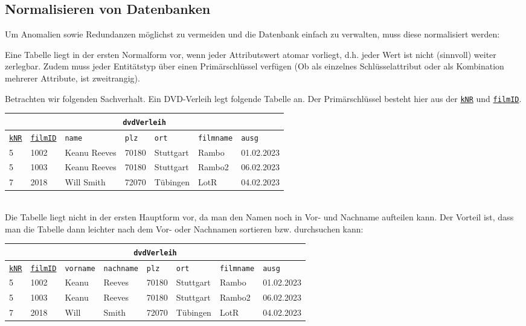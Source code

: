 \subsection[Normalisieren]{Normalisieren von Datenbanken}
Um Anomalien sowie Redundanzen möglichst zu vermeiden und die Datenbank einfach zu verwalten, muss diese normalisiert werden:
\begin{tcolorbox}[title=Erste Normalform]
	Eine Tabelle liegt in der ersten Normalform vor, wenn jeder Attributswert atomar vorliegt, d.h. jeder Wert ist nicht (sinnvoll) weiter zerlegbar. Zudem muss jeder Entitätstyp über einen Primärschlüssel verfügen (Ob als einzelnes Schlüsselattribut oder als Kombination mehrerer Attribute, ist zweitrangig).
\end{tcolorbox}
Betrachten wir folgenden Sachverhalt. Ein DVD-Verleih legt folgende Tabelle an. Der Primärschlüssel besteht hier aus der \underline{\lstinline!kNR!} und \underline{\lstinline!filmID!}.
\begin{tabular}{lllllll}
	\multicolumn{7}{c}{\lstinline!dvdVerleih!}\\
	\hline
	\underline{\lstinline!kNR!}&\underline{\lstinline!filmID!}&\lstinline!name!&\lstinline!plz!&\lstinline!ort!&\lstinline!filmname!&\lstinline!ausg!\\
	\hline
	5&1002&Keanu Reeves&70180&Stuttgart&Rambo&01.02.2023\\
	5&1003&Keanu Reeves&70180&Stuttgart&Rambo2&06.02.2023\\
	7&2018&Will Smith&72070&Tübingen&LotR&04.02.2023\\
\end{tabular}\\
Die Tabelle liegt nicht in der ersten Hauptform vor, da man den Namen noch in Vor- und Nachname aufteilen kann. Der Vorteil ist, dass man die Tabelle dann leichter nach dem Vor- oder Nachnamen sortieren bzw. durchsuchen kann:
\begin{tabular}{llllllll}
	\multicolumn{8}{c}{\lstinline!dvdVerleih!}\\
	\hline
	\underline{\lstinline!kNR!}&\underline{\lstinline!filmID!}&\lstinline!vorname!&\lstinline!nachname!&\lstinline!plz!&\lstinline!ort!&\lstinline!filmname!&\lstinline!ausg!\\
	\hline
	5&1002&Keanu&Reeves&70180&Stuttgart&Rambo&01.02.2023\\
	5&1003&Keanu&Reeves&70180&Stuttgart&Rambo2&06.02.2023\\
	7&2018&Will&Smith&72070&Tübingen&LotR&04.02.2023\\
\end{tabular}

